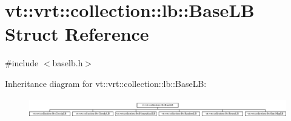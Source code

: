 \hypertarget{structvt_1_1vrt_1_1collection_1_1lb_1_1_base_l_b}{}\section{vt\+:\+:vrt\+:\+:collection\+:\+:lb\+:\+:Base\+LB Struct Reference}
\label{structvt_1_1vrt_1_1collection_1_1lb_1_1_base_l_b}


{\ttfamily \#include $<$baselb.\+h$>$}

Inheritance diagram for vt\+:\+:vrt\+:\+:collection\+:\+:lb\+:\+:Base\+LB\+:\begin{figure}[H]
\begin{center}
\leavevmode
\includegraphics[height=0.856269cm]{structvt_1_1vrt_1_1collection_1_1lb_1_1_base_l_b}
\end{center}
\end{figure}
